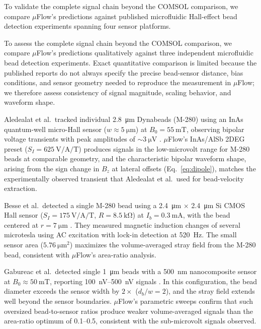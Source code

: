\documentclass[preprint,review,12pt]{elsarticle}
\begin{document}
To validate the complete signal chain beyond the COMSOL comparison, we compare $\mu$Flow's predictions against published microfluidic Hall-effect bead detection experiments spanning four sensor platforms.

To assess the complete signal chain beyond the COMSOL comparison, we compare $\mu$Flow's predictions qualitatively against three independent microfluidic bead detection experiments. Exact quantitative comparison is limited because the published reports do not always specify the precise bead-sensor distance, bias conditions, and sensor geometry needed to reproduce the measurement in $\mu$Flow; we therefore assess consistency of signal magnitude, scaling behavior, and waveform shape.

Aledealat et al.\ tracked individual \SI{2.8}{\micro\meter} Dynabeads (M-280) using an InAs quantum-well micro-Hall sensor ($w \approx \SI{5}{\micro\meter}$) at $B_0 = \SI{55}{\milli\tesla}$, observing bipolar voltage transients with peak amplitudes of ${\sim}\SI{3}{\micro\volt}$ \cite{aledealat2009}. $\mu$Flow's InAs/AlSb 2DEG preset ($S_I = \SI{625}{\volt\per\ampere\per\tesla}$) produces signals in the low-microvolt range for M-280 beads at comparable geometry, and the characteristic bipolar waveform shape, arising from the sign change in $B_z$ at lateral offsets (Eq.~\eqref{eq:dipole}), matches the experimentally observed transient that Aledealat et al.\ used for bead-velocity extraction.

Besse et al.\ detected a single M-280 bead using a \SI{2.4}{\micro\meter} $\times$ \SI{2.4}{\micro\meter} Si CMOS Hall sensor ($S_I = \SI{175}{\volt\per\ampere\per\tesla}$, $R = \SI{8.5}{\kilo\ohm}$) at $I_b = \SI{0.3}{\milli\ampere}$, with the bead centered at $r = \SI{7}{\micro\meter}$ \cite{besse2002}. They measured magnetic induction changes of several microtesla using AC excitation with lock-in detection at \SI{520}{\hertz}. The small sensor area ($\SI{5.76}{\micro\meter\squared}$) maximizes the volume-averaged stray field from the M-280 bead, consistent with $\mu$Flow's area-ratio analysis.

Gabureac et al.\ detected single \SI{1}{\micro\meter} beads with a \SI{500}{\nano\meter} nanocomposite sensor at $B_0 \approx \SI{50}{\milli\tesla}$, reporting \SIrange{100}{500}{\nano\volt} signals \cite{gabureac2013}. In this configuration, the bead diameter exceeds the sensor width by $2\times$ ($d_b/w = 2$), and the stray field extends well beyond the sensor boundaries. $\mu$Flow's parametric sweeps confirm that such oversized bead-to-sensor ratios produce weaker volume-averaged signals than the area-ratio optimum of 0.1--0.5, consistent with the sub-microvolt signals observed.
\end{document}
